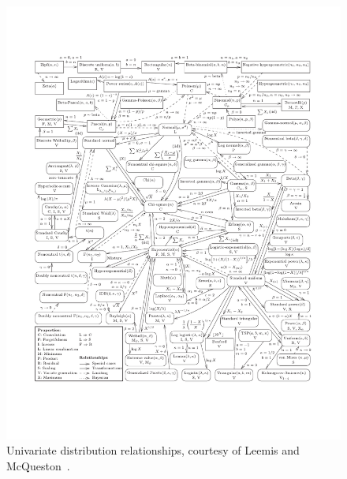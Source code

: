 \documentclass[landscape]{article}
\begin{document}
\begin{figure}
  \captionsetup{labelformat=empty,labelsep=none}
  \includegraphics[width=\textwidth]{relationships}
  \caption{Univariate distribution relationships, 
  courtesy of Leemis and McQueston~\cite{Leemis08}.}
\end{figure}
\end{document}
